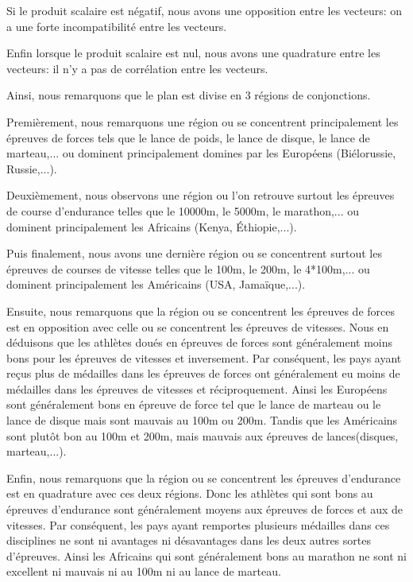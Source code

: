 \documentclass{article}
\begin{document}
Si le produit scalaire est négatif, nous avons une opposition entre les vecteurs: on a une forte incompatibilité entre les vecteurs.
\newline

Enfin lorsque le produit scalaire est nul, nous avons une quadrature entre les vecteurs: il n'y a pas de corrélation entre les vecteurs.
\newline

Ainsi, nous remarquons que le plan est divise en 3 régions de conjonctions.
\newline

Premièrement, nous remarquons une région ou se concentrent principalement les épreuves de forces tels que le lance de poids, le lance de disque, le lance de marteau,... ou dominent principalement domines par les Européens (Biélorussie, Russie,...).
\newline

Deuxièmement, nous observons une région ou l'on retrouve surtout les épreuves de course d'endurance telles que le 10000m, le 5000m, le marathon,... ou dominent principalement les Africains (Kenya, Éthiopie,...).
\newline

Puis finalement, nous avons une dernière région ou se concentrent surtout les épreuves de courses de vitesse telles que le 100m, le 200m, le 4*100m,... ou dominent principalement les Américains (USA, Jamaïque,...).
\newline

Ensuite, nous remarquons que la région ou se concentrent les épreuves de forces est en opposition avec celle ou se concentrent les épreuves de vitesses. Nous en déduisons que les athlètes doués en épreuves de forces sont généralement moins bons pour les épreuves de vitesses et inversement. Par conséquent, les pays ayant reçus plus de médailles dans les épreuves de forces ont généralement eu moins de médailles dans les épreuves de vitesses et réciproquement. Ainsi les Européens sont généralement bons en épreuve de force tel que le lance de marteau ou le lance de disque mais sont mauvais au 100m ou 200m. Tandis que les Américains sont plutôt bon au 100m et 200m, mais mauvais aux épreuves de lances(disques, marteau,...).
\newline

Enfin, nous remarquons que la région ou se concentrent les épreuves d'endurance est en quadrature avec ces deux régions. Donc les athlètes qui sont bons au épreuves d'endurance sont généralement moyens aux épreuves de forces et aux de vitesses. Par conséquent, les pays ayant remportes plusieurs médailles dans ces disciplines ne sont ni avantages ni désavantages dans les deux autres sortes d'épreuves. Ainsi les Africains qui sont généralement bons au marathon ne sont ni excellent ni mauvais ni au 100m ni au lance de marteau.
\end{document}
